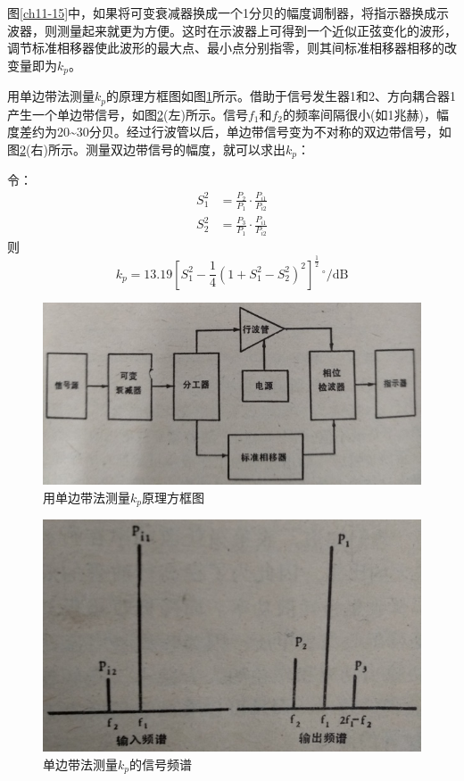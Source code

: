图\ref{ch11-15}中，如果将可变衰减器换成一个1分贝的幅度调制器，将指示器换成示波器，则测量起来就更为方便。这时在示波器上可得到一个近似正弦变化的波形，调节标准相移器使此波形的最大点、最小点分别指零，则其间标准相移器相移的改变量即为$ k_p $。


用单边带法测量$ k_p $的原理方框图如图\ref{ch11-16}所示。借助于信号发生器1和2、方向耦合器1产生一个单边带信号，如图\ref{ch11-17}(左)所示。信号$ f_1 $和$ f_2 $的频率间隔很小(如1兆赫)，幅度差约为20\textasciitilde30分贝。经过行波管以后，单边带信号变为不对称的双边带信号，如图\ref{ch11-17}(右)所示。测量双边带信号的幅度，就可以求出$ k_p $：

令：\begin{equation*}
	\begin{aligned}
	S_1^2 &= \frac{P_2}{P_1}\cdot \frac{P_{i1}}{P_{i2}}\\
	S_2^2 & = \frac{P_3}{P_1}\cdot\frac{P_{i1}}{P_{i2}}
	\end{aligned}
\end{equation*}
则
\begin{equation}\label{eq:11-15}
	k_p = 13.19\left[ S_1^2 - \frac{1}{4}\left( 1+S_1^2 - S_2^2 \right)^2 \right]^\frac{1}{2} \, {}^\circ/\textrm{dB}
\end{equation}
\begin{figure}[phtb]
	\centering
	\includegraphics[width=0.6\linewidth]{figure/ch11-16}
	\caption{用单边带法测量$ k_p $原理方框图}
	\label{ch11-16}
\end{figure}

\begin{figure}[phtb]
	\centering
	\includegraphics[width=0.6\linewidth]{figure/ch11-17}
	\caption{单边带法测量$ k_p的信号频谱 $}
	\label{ch11-17}
\end{figure}

